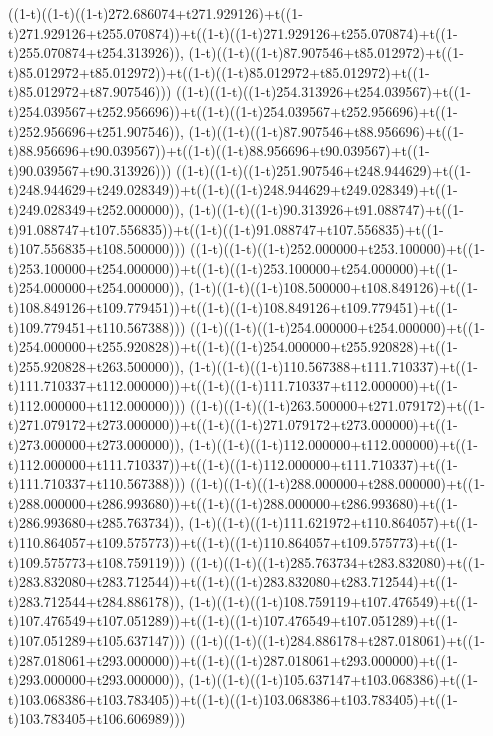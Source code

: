 ((1-t)((1-t)((1-t)272.686074+t271.929126)+t((1-t)271.929126+t255.070874))+t((1-t)((1-t)271.929126+t255.070874)+t((1-t)255.070874+t254.313926)),                                     (1-t)((1-t)((1-t)87.907546+t85.012972)+t((1-t)85.012972+t85.012972))+t((1-t)((1-t)85.012972+t85.012972)+t((1-t)85.012972+t87.907546)))
((1-t)((1-t)((1-t)254.313926+t254.039567)+t((1-t)254.039567+t252.956696))+t((1-t)((1-t)254.039567+t252.956696)+t((1-t)252.956696+t251.907546)),                                     (1-t)((1-t)((1-t)87.907546+t88.956696)+t((1-t)88.956696+t90.039567))+t((1-t)((1-t)88.956696+t90.039567)+t((1-t)90.039567+t90.313926)))
((1-t)((1-t)((1-t)251.907546+t248.944629)+t((1-t)248.944629+t249.028349))+t((1-t)((1-t)248.944629+t249.028349)+t((1-t)249.028349+t252.000000)),                                     (1-t)((1-t)((1-t)90.313926+t91.088747)+t((1-t)91.088747+t107.556835))+t((1-t)((1-t)91.088747+t107.556835)+t((1-t)107.556835+t108.500000)))
((1-t)((1-t)((1-t)252.000000+t253.100000)+t((1-t)253.100000+t254.000000))+t((1-t)((1-t)253.100000+t254.000000)+t((1-t)254.000000+t254.000000)),                                     (1-t)((1-t)((1-t)108.500000+t108.849126)+t((1-t)108.849126+t109.779451))+t((1-t)((1-t)108.849126+t109.779451)+t((1-t)109.779451+t110.567388)))
((1-t)((1-t)((1-t)254.000000+t254.000000)+t((1-t)254.000000+t255.920828))+t((1-t)((1-t)254.000000+t255.920828)+t((1-t)255.920828+t263.500000)),                                     (1-t)((1-t)((1-t)110.567388+t111.710337)+t((1-t)111.710337+t112.000000))+t((1-t)((1-t)111.710337+t112.000000)+t((1-t)112.000000+t112.000000)))
((1-t)((1-t)((1-t)263.500000+t271.079172)+t((1-t)271.079172+t273.000000))+t((1-t)((1-t)271.079172+t273.000000)+t((1-t)273.000000+t273.000000)),                                     (1-t)((1-t)((1-t)112.000000+t112.000000)+t((1-t)112.000000+t111.710337))+t((1-t)((1-t)112.000000+t111.710337)+t((1-t)111.710337+t110.567388)))
((1-t)((1-t)((1-t)288.000000+t288.000000)+t((1-t)288.000000+t286.993680))+t((1-t)((1-t)288.000000+t286.993680)+t((1-t)286.993680+t285.763734)),                                     (1-t)((1-t)((1-t)111.621972+t110.864057)+t((1-t)110.864057+t109.575773))+t((1-t)((1-t)110.864057+t109.575773)+t((1-t)109.575773+t108.759119)))
((1-t)((1-t)((1-t)285.763734+t283.832080)+t((1-t)283.832080+t283.712544))+t((1-t)((1-t)283.832080+t283.712544)+t((1-t)283.712544+t284.886178)),                                     (1-t)((1-t)((1-t)108.759119+t107.476549)+t((1-t)107.476549+t107.051289))+t((1-t)((1-t)107.476549+t107.051289)+t((1-t)107.051289+t105.637147)))
((1-t)((1-t)((1-t)284.886178+t287.018061)+t((1-t)287.018061+t293.000000))+t((1-t)((1-t)287.018061+t293.000000)+t((1-t)293.000000+t293.000000)),                                     (1-t)((1-t)((1-t)105.637147+t103.068386)+t((1-t)103.068386+t103.783405))+t((1-t)((1-t)103.068386+t103.783405)+t((1-t)103.783405+t106.606989)))
